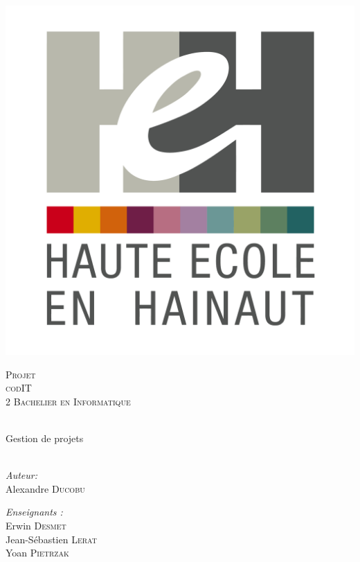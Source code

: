 \begin{center}
  \includegraphics[scale=0.12]{textures/logo/heh.pdf}

  \vspace{1cm}

  \textsc{\LARGE Projet} \\ [0.5cm]
  \textsc{\Large codIT} \\ [0.5cm]

  \textsc{\large 2 Bachelier en Informatique} \\ [0.2cm]

  \begingroup
   \selectfont 

  \HRule \\ [0.4cm] {
    \huge Gestion de projets \\ [0.2cm] 
  }
  \HRule \\ [1.3cm]
  \endgroup
  \begin{minipage}[t]{0.4 \textwidth} 
    \begin{flushleft} 
      \large \emph{Auteur:} \\ 
      Alexandre \textsc{Ducobu}
    \end{flushleft} 
  \end{minipage}
  \begin{minipage}[t]{0.4 \textwidth}
    \begin{flushright} 
      \large \emph{Enseignants :} \\ 
      Erwin \textsc{Desmet} \\
      Jean-Sébastien \textsc{Lerat} \\
      Yoan \textsc{Pietrzak}
    \end{flushright} 
  \end{minipage}


\end{center}

